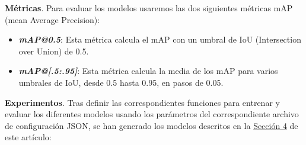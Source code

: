 \documentclass[10pt,twocolumn,letterpaper]{article}
\begin{document}
\textbf{Métricas}. Para evaluar los modelos usaremos las dos siguientes métricas mAP (mean Average Precision):
\begin{itemize}
    \item \textbf{\textit{mAP@0.5}}: Esta métrica calcula el mAP con un umbral de IoU (Intersection over Union) de 0.5.
    \item \textbf{\textit{mAP@[.5:.95]}}: Esta métrica calcula la media de los mAP para varios umbrales de IoU, desde 0.5 hasta 0.95, en pasos de 0.05. \\
\end{itemize}

\textbf{Experimentos}. Tras definir las correspondientes funciones para entrenar y evaluar los diferentes modelos usando los parámetros del correspondiente archivo de configuración JSON, se han generado los modelos descritos en la \hyperref[sec:metodos]{Sección 4} de este artículo:
\end{document}
